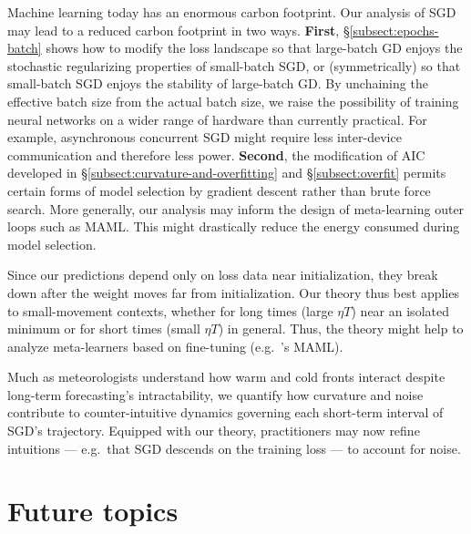 \documentclass[openany, notitlepage, justified]{tufte-book}
\theoremstyle{plain}
\theoremstyle{definition}
\begin{document}
    Machine learning today has an enormous carbon footprint.\cite{st19}  Our
    analysis of SGD may lead to a reduced carbon footprint in two ways. 
    \textbf{First}, \S\ref{subsect:epochs-batch} shows how to modify the loss
    landscape so that large-batch GD enjoys the stochastic regularizing
    properties of small-batch SGD, or (symmetrically) so that small-batch SGD
    enjoys the stability of large-batch GD.  By unchaining the effective batch
    size from the actual batch size, we raise the possibility of training
    neural networks on a wider range of hardware than currently practical.  For
    example, asynchronous concurrent SGD\cite{ni11} might require less
    inter-device communication and therefore less power.
    \textbf{Second}, the modification of AIC developed in
    \S\ref{subsect:curvature-and-overfitting} and \S\ref{subsect:overfit}
    permits certain forms of model selection by gradient descent rather than
    brute force search.  More generally, our analysis may inform the design of
    meta-learning outer loops such as MAML.\cite{fi17}  This might
    drastically reduce the energy consumed during model selection.



    Since our predictions depend only on loss data near initialization, they
    break down after the weight moves far from initialization.  Our theory thus
    best applies to small-movement contexts, whether for long times (large
    $\eta T$) near an isolated minimum or for short times (small $\eta T$) in
    general.  Thus, the theory might help to analyze meta-learners based on
    fine-tuning (e.g.\ \citep{fi17}'s MAML).

    Much as meteorologists understand how warm and cold fronts interact despite
    long-term forecasting's intractability, we quantify how curvature and noise
    contribute to counter-intuitive dynamics governing each short-term interval
    of SGD's trajectory.  Equipped with our theory, practitioners may now
    refine intuitions --- e.g.\ that SGD descends on the training loss --- to
    account for noise.

    \section{Future topics}                                      \label{appendix:future}
\end{document}
